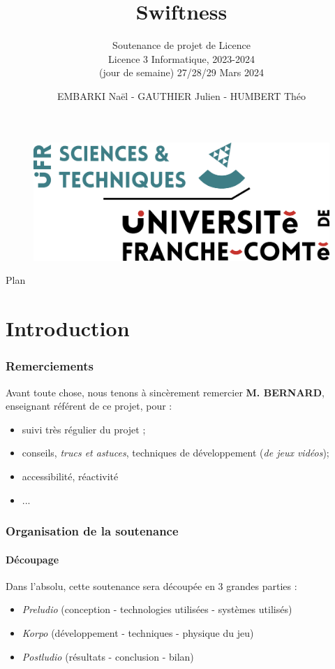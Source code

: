 \documentclass{beamer}
\date{}
\title{Swiftness}
\subtitle{Soutenance de projet de Licence \\ \medskip Licence 3 Informatique, 2023-2024 \\ \medskip (jour de semaine) 27/28/29 Mars 2024}
\author{EMBARKI Naël - GAUTHIER Julien - HUMBERT Théo}
\begin{document}
\begin{frame}
\thispagestyle{empty}
\begin{figure}
\begin{flushleft}
\begin{minipage}{10cm}
\hspace*{-1cm}
\vspace*{-14cm}
\includegraphics[width=0.25\linewidth]{logo_st.png}
\end{minipage}
\end{flushleft}
\end{figure}

\titlepage
\end{frame}

\begin{frame}{Plan}
\tableofcontents
\end{frame}
\section{Introduction}
\begin{frame}
\frametitle{Remerciements}
\begin{tcolorbox}[colback=yellow!20!white,colframe=yellow!60!black]
Avant toute chose, nous tenons à sincèrement remercier \textbf{M. BERNARD}, enseignant référent de ce projet, pour : 
\begin{itemize}
\item suivi très régulier du projet ;
\item conseils, \textit{trucs et astuces}, techniques de développement (\textit{de jeux vidéos});
\item accessibilité, réactivité
\item ... 
\end{itemize}
\end{tcolorbox}
\end{frame}
\begin{frame}
\frametitle{Organisation de la soutenance}
\framesubtitle{Découpage}
Dans l'absolu, cette soutenance sera découpée en 3 grandes parties :
\begin{itemize}
\item \textit{Preludio} (conception - technologies utilisées - systèmes utilisés)
\item \textit{Korpo} (développement - techniques - physique du jeu)
\item \textit{Postludio} (résultats - conclusion - bilan)
\end{itemize}
\end{frame}
\end{document}
